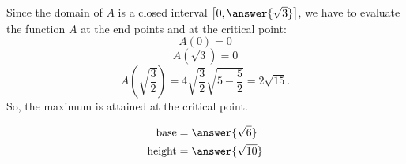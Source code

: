 \documentclass{ximera}
\begin{document}
\begin{exercise}
\begin{hint}
Since the domain of $A$ is a closed interval $\left[0,\answer{\sqrt{3}}\right]$, 
we have to evaluate the function $A$ at the end points and at the critical point:
 \[
A(0)=0
  \]
  \[
A(\sqrt{3})=0
  \]
  \[
A\left(\sqrt{\frac{3}{2}}\right)=4\sqrt{\frac{3}{2}}\sqrt{5-  \frac{5}{2}}=2\sqrt{15}.
  \]
  So, the maximum is attained at the critical point.
\end{hint}
  \begin{prompt}
  \begin{align*}
  \text{base}&= \answer{\sqrt{6}}\\
  \text{height} &= \answer{\sqrt{10}}
  \end{align*}
  \end{prompt}
\end{exercise}
\end{document}
